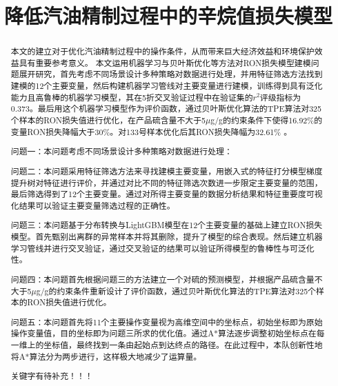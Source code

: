 \documentclass[bwprint]{gmcmthesis}
\title{降低汽油精制过程中的辛烷值损失模型}
\begin{document}
 \maketitle



\begin{abstract}
本文的建立对于优化汽油精制过程中的操作条件，从而带来巨大经济效益和环境保护效益具有重要参考意义。
本文运用机器学习与贝叶斯优化等方法对RON损失模型建模问题展开研究，首先考虑不同场景设计多种策略对数据进行处理，并用特征筛选方法找到建模的12个主要变量，然后构建机器学习管线对主要变量进行建模，训练得到具有泛化能力且高鲁棒的机器学习模型，其在5折交叉验证过程中在验证集的$r^2$评级指标为0.373。最后用这个机器学习模型作为评价函数，通过贝叶斯优化算法的TPE算法对325个样本的RON损失值进行优化，在产品硫含量不大于5$\mu$g/g的约束条件下使得16.92\%的变量RON损失降幅大于30\%。对133号样本优化后其RON损失降幅为32.61\% 。


问题一：本问题考虑不同场景设计多种策略对数据进行处理：

问题二：本问题采用特征筛选方法来寻找建模主要变量，用嵌入式的特征打分模型梯度提升树对特征进行评价，并通过对比不同的特征筛选次数进一步限定主要变量的范围，最后筛选得到了12个主要变量。通过对所得主要变量的数据分析结果和特征重要度可视化结果可以验证主要变量筛选过程的正确性。

问题三：本问题基于分布转换与LightGBM模型在12个主要变量的基础上建立RON损失模型。首先甄别出离群的异常样本并将其删除，提升了模型的综合表现。然后建立机器学习管线并进行交叉验证，通过交叉验证的结果可以验证所得模型的鲁棒性与可泛化性。

问题四：本问题首先根据问题三的方法建立一个对硫的预测模型，并根据产品硫含量不大于5$\mu$g/g的约束条件重新设计了评价函数，通过贝叶斯优化算法的TPE算法对325个样本的RON损失值进行优化。

问题五：本问题首先将11个主要操作变量视为高维空间中的坐标点，初始坐标即为原始操作变量值，目的坐标即为问题三所求的优化值。通过A*算法逐步调整初始坐标点在每一维上的坐标值，最终找到一条由起始点到达终点的路径。在此过程中，本队创新性地将A*算法分为两步进行，这样极大地减少了运算量。



关键字有待补充！！！
\end{abstract}
\end{document}
